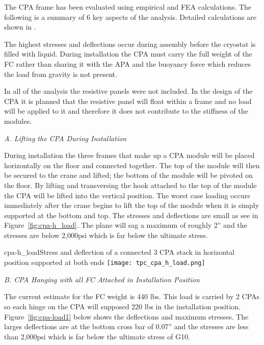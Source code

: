 The CPA frame has been evaluated using empirical and FEA calculations.  The following is a summary of 6 key aspects of the analysis. Detailed calculations are shown in 
.  

The highest stresses and deflections occur during assembly before the cryostat is filled with liquid.  During installation the CPA must carry the full weight of the FC rather than sharing it with the APA and the buoyancy force which reduces the load from gravity is not present.

In all of the analysis the resistive panels were not included.  In the design of the CPA it is planned that the resistive panel will float within a frame and no load will be applied to it and therefore it does not contribute to the stiffness of the modules.  

{\it A. Lifting the CPA During Installation}

During installation the three frames that make up a CPA module will be placed horizontally on the floor and connected together.  The top of the module will then be secured to the crane and lifted; the bottom of the module will be pivoted on the floor.  By lifting and transversing the hook attached to the top of the module the CPA will be lifted into the vertical position.  The worst case loading occurs immediately after the crane begins to lift the top of the module when it is simply supported at the bottom and top.  The stresses and deflections are small as see in Figure~\ref{fig:cpa-h_load}.   The plane will sag a maximum of roughly 2'' and the stresses are below 2,000psi which is far below the ultimate stress.  

\begin{cdrfigure}{cpa-h_load}{Stress and deflection of a connected 3 CPA stack in horizontal position supported at both ends} 
\texttt{[image: tpc\_cpa\_h\_load.png]}
\end{cdrfigure}


{\it  B. CPA Hanging with all FC Attached in Installation Position}

The current estimate for the FC weight is 440 lbs.  This load is carried by 2 CPAs so each hinge on the CPA will supposed 220 lbs in the installation position.  Figure~\ref{fig:cpa-load1} below shows the deflections and maximum stresses.  The larges deflections are at the bottom cross bar of 0.07'' and the stresses are less than 2,000psi which is far below the ultimate stress of G10.

